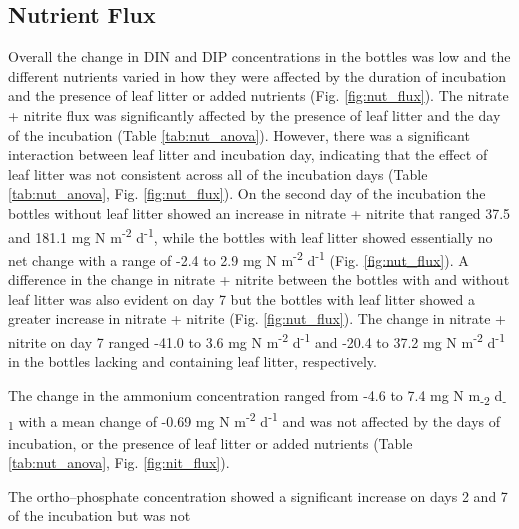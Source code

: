 
\subsection{Nutrient Flux}

Overall the change in DIN and DIP concentrations in the bottles was low and the different nutrients varied in how they were affected by the duration of incubation and the presence of leaf litter or added nutrients (Fig. \ref{fig:nut_flux}).  The nitrate + nitrite flux was significantly affected by the presence of leaf litter and the day of the incubation (Table \ref{tab:nut_anova}). However, there was a significant interaction between leaf litter and incubation day, indicating that the effect of leaf litter was not consistent across all of the incubation days (Table \ref{tab:nut_anova}, Fig. \ref{fig:nut_flux}). On the second day of the incubation the bottles without leaf litter showed an increase in nitrate + nitrite that ranged 37.5 and 181.1 mg N m\textsuperscript{-2} d\textsuperscript{-1}, while the bottles with leaf litter showed essentially no net change with a range of -2.4 to 2.9 mg N m\textsuperscript{-2} d\textsuperscript{-1} (Fig. \ref{fig:nut_flux}).  A difference in the change in nitrate + nitrite between the bottles with and without leaf litter was also evident on day 7 but the bottles with leaf litter showed a greater increase in nitrate + nitrite (Fig. \ref{fig:nut_flux}). The change in nitrate + nitrite on day 7 ranged -41.0 to 3.6 mg N m\textsuperscript{-2} d\textsuperscript{-1} and -20.4 to 37.2 mg N m\textsuperscript{-2} d\textsuperscript{-1} in the bottles lacking and containing leaf litter, respectively. 

The change in the ammonium concentration ranged from -4.6 to 7.4 mg N m\textsubscript{-2} d\textsubscript{-1} with a mean change of -0.69 mg N m\textsuperscript{-2} d\textsuperscript{-1} and was not affected by the days of incubation, or the presence of leaf litter or added nutrients (Table \ref{tab:nut_anova}, Fig. \ref{fig:nit_flux}).

The ortho--phosphate concentration showed a significant increase on days 2 and 7 of the incubation but was not

